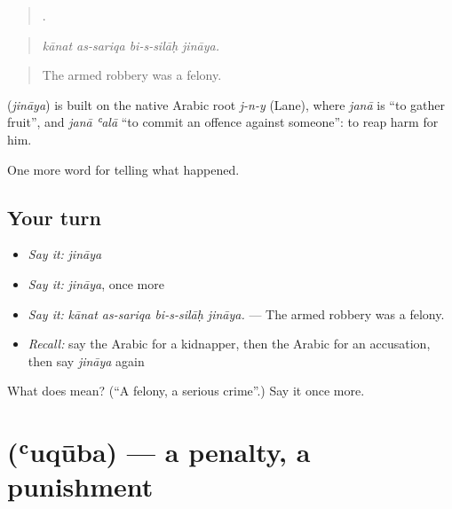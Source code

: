 \begin{quote}
   .
\end{quote}

\begin{quote}
\emph{kānat as-sariqa bi-s-silāḥ jināya.}
\end{quote}

\begin{quote}
The armed robbery was a felony.
\end{quote}

\begin{cousinweb}
\textbf{} (\emph{jināya}) is built on the native Arabic root \emph{j-n-y} (Lane), where \emph{janā} is \textquotedblleft{}to gather fruit\textquotedblright{}, and \emph{janā ʿalā} \textquotedblleft{}to commit an offence against someone\textquotedblright{}: to reap harm for him.
\end{cousinweb}

\begin{grammarlens}[title={What you've built}]
One more word for telling what happened.
\end{grammarlens}

\subsection*{Your turn}
\begin{itemize}
\raggedright
  \item \emph{Say it:} \emph{jināya}
  \item \emph{Say it:} \emph{jināya}, once more
  \item \emph{Say it:} \emph{kānat as-sariqa bi-s-silāḥ jināya.} — The armed robbery was a felony.
  \item \emph{Recall:} say the Arabic for a kidnapper, then the Arabic for an accusation, then say \emph{jināya} again
\end{itemize}

\begin{tcolorbox}[breakable,colback=teal!4,colframe=teal!35!black,title={Before you move on}]
What does  mean? (\textquotedblleft{}A felony, a serious crime\textquotedblright{}.) Say it once more.
\end{tcolorbox}
\section[\texorpdfstring{\ar{عقوبة} (ʿuqūba)}{عقوبة (ʿuqūba)}]{ (ʿuqūba) — a penalty, a punishment}

